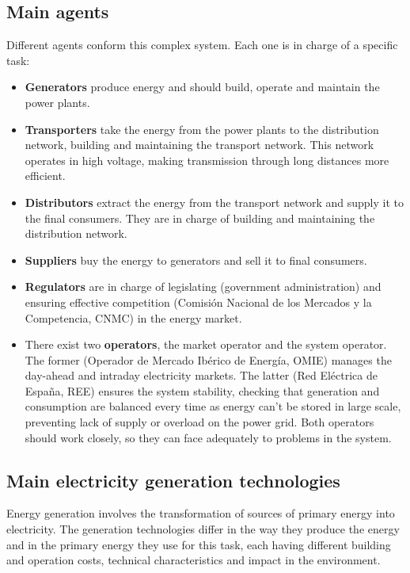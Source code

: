 \subsection{Main agents}
Different agents conform this complex system. Each one is in charge of a specific task:\cite{mercado-electrico-endesa, organismos-reguladores-holaluz}

\begin{itemize}
    \item \textbf{Generators} produce energy and should build, operate and maintain the power plants.
    \item \textbf{Transporters} take the energy from the power plants to the distribution network, building and maintaining the transport network. This network operates in high voltage, making transmission through long distances more efficient.
    \item \textbf{Distributors} extract the energy from the transport network and supply it to the final consumers. They are in charge of building and maintaining the distribution network.
    \item \textbf{Suppliers} buy the energy to generators and sell it to final consumers.
    \item \textbf{Regulators} are in charge of legislating (government administration) and ensuring effective competition (Comisión Nacional de los Mercados y la Competencia, CNMC) in the energy market.
    \item There exist two \textbf{operators}, the market operator and the system operator. The former (Operador de Mercado Ibérico de Energía, OMIE) manages the day-ahead and intraday electricity markets. The latter (Red Eléctrica de España, REE) ensures the system stability, checking that generation and consumption are balanced every time as energy can't be stored in large scale, preventing lack of supply or overload on the power grid. Both operators should work closely, so they can face adequately to problems in the system.
\end{itemize}

\subsection{Main electricity generation technologies}
Energy generation involves the transformation of sources of primary energy into electricity.
The generation technologies differ in the way they produce the energy and in the primary energy they use for this task, each having different building and operation costs, technical characteristics and impact in the environment. \cite{subasta-electrica-totalenergies}


